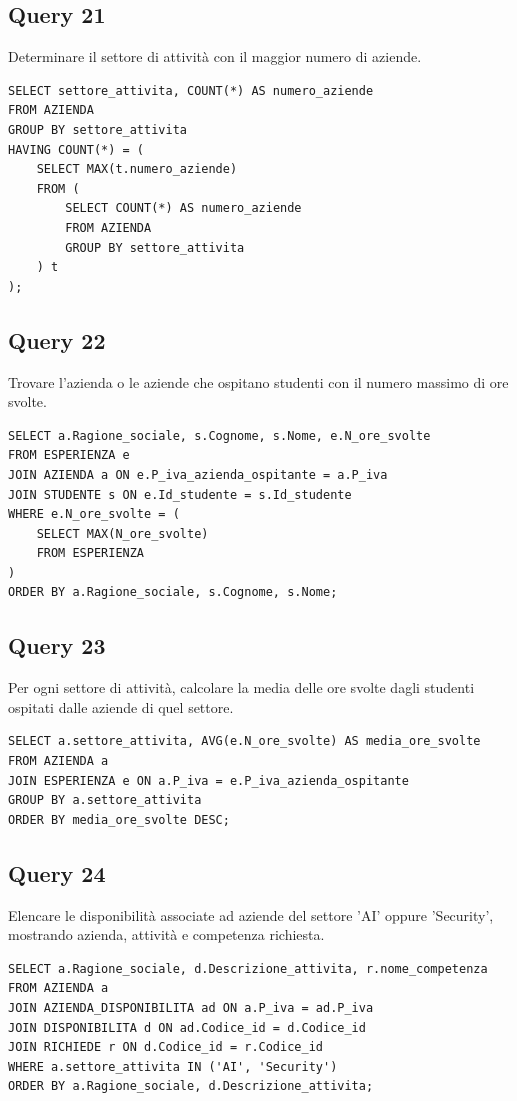 \documentclass[a4paper,12pt]{article}
\begin{document}
\subsection*{Query 21}Determinare il settore di attività con il maggior numero di aziende.
\begin{lstlisting}
SELECT settore_attivita, COUNT(*) AS numero_aziende
FROM AZIENDA
GROUP BY settore_attivita
HAVING COUNT(*) = (
    SELECT MAX(t.numero_aziende)
    FROM (
        SELECT COUNT(*) AS numero_aziende
        FROM AZIENDA
        GROUP BY settore_attivita
    ) t
);
\end{lstlisting}
\subsection*{Query 22}Trovare l'azienda o le aziende che ospitano studenti con il numero massimo di ore svolte.
\begin{lstlisting}
SELECT a.Ragione_sociale, s.Cognome, s.Nome, e.N_ore_svolte
FROM ESPERIENZA e
JOIN AZIENDA a ON e.P_iva_azienda_ospitante = a.P_iva
JOIN STUDENTE s ON e.Id_studente = s.Id_studente
WHERE e.N_ore_svolte = (
    SELECT MAX(N_ore_svolte)
    FROM ESPERIENZA
)
ORDER BY a.Ragione_sociale, s.Cognome, s.Nome;
\end{lstlisting}
\subsection*{Query 23}Per ogni settore di attività, calcolare la media delle ore svolte dagli studenti ospitati dalle aziende di quel settore.
\begin{lstlisting}
SELECT a.settore_attivita, AVG(e.N_ore_svolte) AS media_ore_svolte
FROM AZIENDA a
JOIN ESPERIENZA e ON a.P_iva = e.P_iva_azienda_ospitante
GROUP BY a.settore_attivita
ORDER BY media_ore_svolte DESC;
\end{lstlisting}
\subsection*{Query 24}Elencare le disponibilità associate ad aziende del settore 'AI' oppure 'Security', mostrando azienda, attività e competenza richiesta.
\begin{lstlisting}
SELECT a.Ragione_sociale, d.Descrizione_attivita, r.nome_competenza
FROM AZIENDA a
JOIN AZIENDA_DISPONIBILITA ad ON a.P_iva = ad.P_iva
JOIN DISPONIBILITA d ON ad.Codice_id = d.Codice_id
JOIN RICHIEDE r ON d.Codice_id = r.Codice_id
WHERE a.settore_attivita IN ('AI', 'Security')
ORDER BY a.Ragione_sociale, d.Descrizione_attivita;
\end{lstlisting}
\end{document}
